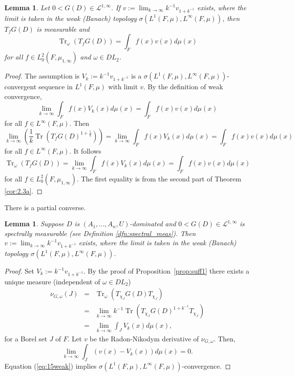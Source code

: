\documentclass[final,1p]{elsarticle}
\numberwithin{equation}{section}
\theoremstyle{plain}
\newtheorem{lemma}[thm]{Lemma}
\theoremstyle{definition}
\newcounter{prop2count}
\begin{document}
\begin{lemma} \label{thm:conv}
Let $0 < G(D) \in \mathcal{L}^{1,\infty}$.  If
$v := \lim_{k \to \infty} k^{-1} v_{1+k^{-1}}$
exists, where the limit is taken in the weak (Banach) topology
$\sigma(L^1(F,\mu),L^\infty(F,\mu))$, then $T_fG(D)$ is measurable and
$$
\operatorname{Tr}_\omega(T_fG(D)) = \int_F f(x) v(x)d\mu(x)
$$
for all $f \in L_0^2(F,\mu_{1,\infty})$ and $\omega \in DL_2$.
\end{lemma}
\begin{proof}
The assumption is $V_k := k^{-1} v_{1+k^{-1}}$ is a $\sigma(L^1(F,\mu),L^\infty(F,\mu))$-convergent sequence in $L^1(F,\mu)$
with limit $v$.  By the definition of weak convergence,
$$
\lim_{k \to \infty} \int_F f(x) V_k(x) d\mu(x) = \int_F f(x) v(x) d\mu(x)
$$
for all  $f \in L^\infty(F,\mu)$.  Then
$$
\lim_{k \to \infty} \left( \frac 1k \operatorname{Tr}(T_fG(D)^{1+\frac 1k}) \right)
 =  \lim_{k \to \infty} \int_F f(x) V_k(x) d\mu(x)
 =  \int_F f(x) v(x) d\mu(x)
$$
for all $f \in L^\infty(F,\mu)$.  It follows
$$
\operatorname{Tr}_{\omega}(T_{f}G(D)) = \lim_{k \to \infty} \int_F f(x) V_k(x) d\mu(x) =  \int_F f(x) v(x) d\mu(x)
$$
for all $f \in L_0^2(F,\mu_{1,\infty})$.  The first equality is from
the second part of Theorem \ref{cor:2.3a}.
\end{proof}

There is a partial converse.

\begin{lemma} \label{cor:partconv}
Suppose $D$ is $(A_1,\ldots,A_n,U)$-dominated and $0 < G(D) \in \mathcal{L}^{1,\infty}$ is spectrally measurable (see Definition \ref{dfn:spectral_meas}).
Then $v := \lim_{k \to \infty} k^{-1} v_{1+k^{-1}}$ exists, where the limit is taken in the weak (Banach) topology
$\sigma(L^1(F,\mu),L^\infty(F,\mu))$.
\end{lemma}
\begin{proof}
  Set $V_k := k^{-1} v_{1+k^{-1}}$.  By the proof of
  Proposition~\ref{prop:suff1} there exists a unique measure
  (independent of $\omega \in DL_2$)
\begin{eqnarray*}
\nu_{G,\omega}(J)
& = & \operatorname{Tr}_\omega(T_{\chi_J}G(D)T_{\chi_J}) \\
& = & \lim_{k \to \infty} k^{-1} \operatorname{Tr}(T_{\chi_J}G(D)^{1+k^{-1}}T_{\chi_J}) \\
& = & \lim_{k \to \infty} \int_J V_k(x) d\mu(x),
\end{eqnarray*}
for a Borel set $J$ of $F$.  Let $v$ be the Radon-Nikodym derivative of
$\nu_{G,\omega}$. 
Then,
\begin{equation} \label{eq:15weak}
\lim_{k \to \infty} \int_J (v(x) - V_k(x)) d\mu(x) = 0 .
\end{equation}
Equation (\ref{eq:15weak}) implies $\sigma(L^1(F,\mu),L^\infty(F,\mu))$-convergence.
\end{proof}
\end{document}

